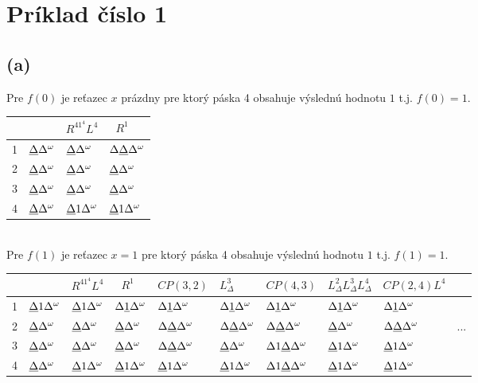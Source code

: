 \documentclass[11pt,a4paper]{article}
\newcommand{\D}{\Delta}
\newcommand{\EOT}{\Delta^\omega} %
\newcommand{\UL}[1]{\underbar{$#1$}} %
\begin{document}
\newpage
\section{Príklad číslo 1}

\subsection{(a)}

Pre $f(0)$ je reťazec $x$ prázdny pre ktorý páska 4 obsahuje výslednú hodnotu $1$ t.j. $f(0)=1$.\\[-0.5em]

\begin{tabular}{r|l|l|l}
    &                    & \tiny{$R^41^4L^4$}   & \tiny{$R^1$} \\\hline
  1 & $\UL{\D} \EOT$ & $\UL{\D} \EOT$   & $\D \UL{\D} \EOT$    \\
  2 & $\UL{\D} \EOT$ & $\UL{\D} \EOT$   & $\UL{\D} \EOT$       \\
  3 & $\UL{\D} \EOT$ & $\UL{\D} \EOT$   & $\UL{\D} \EOT$       \\
  4 & $\UL{\D} \EOT$ & $\UL{\D} 1 \EOT$ & $\UL{\D} 1 \EOT$     \\
\end{tabular}

\hfill\\[-5mm]

Pre $f(1)$ je reťazec $x = 1$ pre ktorý páska 4 obsahuje výslednú hodnotu $1$ t.j. $f(1)=1$.\\[-0.5em]

\begin{tabular}{r|l|l|l|l|l|l|l|l|l}
    &                  &\tiny{$R^41^4L^4$}& \tiny{$R^1$}     & \tiny{$CP(3,2)$}  & \tiny{$L^3_\D$}   & \tiny{$CP(4,3)$}    &\tiny{$L^2_\D L^3_\D L^4_\D$}& \tiny{$CP(2,4)L^4$} & \\\hline
  1 & $\UL{\D} 1 \EOT$ & $\UL{\D} 1 \EOT$ & $\D \UL{1} \EOT$ & $\D \UL{1} \EOT$  & $\D \UL{1} \EOT$  & $\D \UL{1} \EOT$    & $\D \UL{1} \EOT$            & $\D \UL{1} \EOT$    & \\
  2 & $\UL{\D} \EOT$   & $\UL{\D} \EOT$   & $\UL{\D} \EOT$   & $\D \UL{\D} \EOT$ & $\D \UL{\D} \EOT$ & $\D \UL{\D} \EOT$   & $\UL{\D} \EOT$              & $\D \UL{\D} \EOT$   & ... \\
  3 & $\UL{\D} \EOT$   & $\UL{\D} \EOT$   & $\UL{\D} \EOT$   & $\D \UL{\D} \EOT$ & $\UL{\D} \EOT$    & $\D 1 \UL{\D} \EOT$ & $\UL{\D} 1 \EOT$            & $\UL{\D} 1 \EOT$    & \\
  4 & $\UL{\D} \EOT$   & $\UL{\D} 1 \EOT$ & $\UL{\D} 1 \EOT$ & $\UL{\D} 1 \EOT$  & $\UL{\D} 1 \EOT$  & $\D 1 \UL{\D} \EOT$ & $\UL{\D} 1 \EOT$            & $\UL{\D} 1 \EOT$    & \\
\end{tabular}
\end{document}
